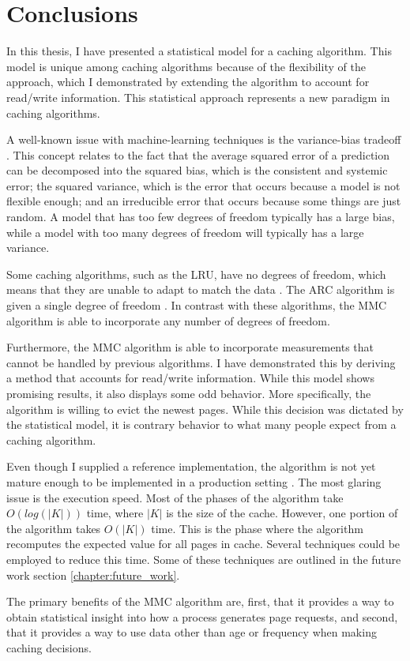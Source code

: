 \chapter{Conclusions}
\label{chapter:conclusions}

In this thesis, I have presented a statistical model for a caching algorithm. This
model is unique among caching algorithms because of the flexibility of the
approach, which I demonstrated by extending the algorithm to account for
read/write information. This statistical approach represents a new paradigm in
caching algorithms.

A well-known issue with machine-learning techniques is the variance-bias
tradeoff \cite{intro_to_statistical_learning}. This concept relates to the fact
that the average squared error of a prediction can be decomposed into the
squared bias, which is the consistent and systemic error; the squared variance,
which is the error that occurs because a model is not flexible enough; and an
irreducible error that occurs because some things are just random. A model that
has too few degrees of freedom typically has a large bias, while a model with
too many degrees of freedom will typically has a large variance.

Some caching algorithms, such as the LRU, have no degrees of freedom, which
means that they are unable to adapt to match the data \cite{aho1971principles}.
The ARC algorithm is given a single degree of freedom \cite{arc}. In contrast
with these algorithms, the MMC algorithm is able to incorporate any number of
degrees of freedom.

Furthermore, the MMC algorithm is able to incorporate measurements that cannot
be handled by previous algorithms. I have demonstrated this by deriving a method
that accounts for read/write information. While this model shows promising
results, it also displays some odd behavior. More specifically, the algorithm is
willing to evict the newest pages. While this decision was dictated by the
statistical model, it is contrary behavior to what many people expect from a
caching algorithm.

Even though I supplied a reference implementation, the algorithm is not yet
mature enough to be implemented in a production setting \cite{supplimental}.
The most glaring issue is the execution speed. Most of the phases of the
algorithm take $O(log(|K|))$ time, where $|K|$ is the size of the cache.
However, one portion of the algorithm takes $O(|K|)$ time. This is the phase
where the algorithm recomputes the expected value for all pages in cache.
Several techniques could be employed to reduce this time. Some of these
techniques are outlined in the future work section \ref{chapter:future_work}.

The primary benefits of the MMC algorithm are, first, that it provides a way to
obtain statistical insight into how a process generates page requests, and
second, that it provides a way to use data other than age or frequency when
making caching decisions.

